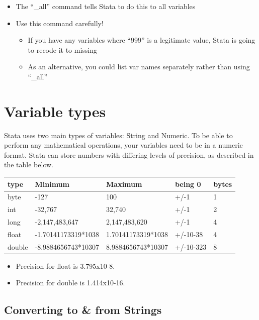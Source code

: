 \documentclass[
]{book}
\providecommand{\tightlist}{%
  \setlength{\itemsep}{0pt}\setlength{\parskip}{0pt}}
\begin{document}
\begin{itemize}
\tightlist
\item
  The ``\_all'' command tells Stata to do this to all variables
\item
  Use this command carefully!

  \begin{itemize}
  \tightlist
  \item
    If you have any variables where ``999'' is a legitimate value, Stata is going to recode it to missing
  \item
    As an alternative, you could list var names separately rather than using ``\_all''
  \end{itemize}
\end{itemize}

\hypertarget{variable-types}{%
\section{Variable types}\label{variable-types}}

Stata uses two main types of variables: String and Numeric. To be able to perform any mathematical operations, your variables need to be in a numeric format. Stata can store numbers with differing levels of precision, as described in the table below.

\begin{longtable}[]{@{}lllll@{}}
\toprule
type & Minimum & Maximum & being 0 & bytes\tabularnewline
\midrule
\endhead
byte & -127 & 100 & +/-1 & 1\tabularnewline
int & -32,767 & 32,740 & +/-1 & 2\tabularnewline
long & -2,147,483,647 & 2,147,483,620 & +/-1 & 4\tabularnewline
float & -1.70141173319*1038 & 1.70141173319*1038 & +/-10-38 & 4\tabularnewline
double & -8.9884656743*10307 & 8.9884656743*10307 & +/-10-323 & 8\tabularnewline
\bottomrule
\end{longtable}

\begin{itemize}
\tightlist
\item
  Precision for float is 3.795x10-8.
\item
  Precision for double is 1.414x10-16.
\end{itemize}

\hypertarget{converting-to-from-strings}{%
\subsection{Converting to \& from Strings}\label{converting-to-from-strings}}
\end{document}
